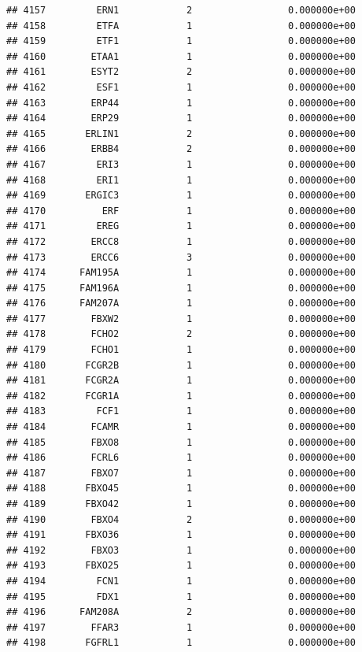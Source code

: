 \documentclass[
]{article}
\begin{document}
\begin{verbatim}
## 4157         ERN1            2                 0.000000e+00
## 4158         ETFA            1                 0.000000e+00
## 4159         ETF1            1                 0.000000e+00
## 4160        ETAA1            1                 0.000000e+00
## 4161        ESYT2            2                 0.000000e+00
## 4162         ESF1            1                 0.000000e+00
## 4163        ERP44            1                 0.000000e+00
## 4164        ERP29            1                 0.000000e+00
## 4165       ERLIN1            2                 0.000000e+00
## 4166        ERBB4            2                 0.000000e+00
## 4167         ERI3            1                 0.000000e+00
## 4168         ERI1            1                 0.000000e+00
## 4169       ERGIC3            1                 0.000000e+00
## 4170          ERF            1                 0.000000e+00
## 4171         EREG            1                 0.000000e+00
## 4172        ERCC8            1                 0.000000e+00
## 4173        ERCC6            3                 0.000000e+00
## 4174      FAM195A            1                 0.000000e+00
## 4175      FAM196A            1                 0.000000e+00
## 4176      FAM207A            1                 0.000000e+00
## 4177        FBXW2            1                 0.000000e+00
## 4178        FCHO2            2                 0.000000e+00
## 4179        FCHO1            1                 0.000000e+00
## 4180       FCGR2B            1                 0.000000e+00
## 4181       FCGR2A            1                 0.000000e+00
## 4182       FCGR1A            1                 0.000000e+00
## 4183         FCF1            1                 0.000000e+00
## 4184        FCAMR            1                 0.000000e+00
## 4185        FBXO8            1                 0.000000e+00
## 4186        FCRL6            1                 0.000000e+00
## 4187        FBXO7            1                 0.000000e+00
## 4188       FBXO45            1                 0.000000e+00
## 4189       FBXO42            1                 0.000000e+00
## 4190        FBXO4            2                 0.000000e+00
## 4191       FBXO36            1                 0.000000e+00
## 4192        FBXO3            1                 0.000000e+00
## 4193       FBXO25            1                 0.000000e+00
## 4194         FCN1            1                 0.000000e+00
## 4195         FDX1            1                 0.000000e+00
## 4196      FAM208A            2                 0.000000e+00
## 4197        FFAR3            1                 0.000000e+00
## 4198       FGFRL1            1                 0.000000e+00

\end{verbatim}
\end{document}
